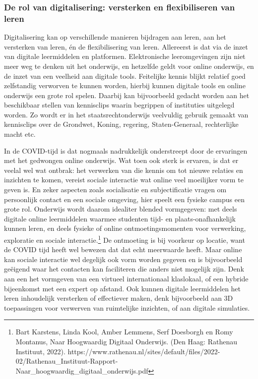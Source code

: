 \documentclass[empirical, authordate, ]{new-jote-article}
\begin{document}
	\subsubsection{De rol van digitalisering: versterken en flexibiliseren van leren}



	Digitalisering kan op verschillende manieren bijdragen aan leren, aan het versterken van leren, én de flexibilisering van leren. Allereerst is dat via de inzet van digitale leermiddelen en platformen. Elektronische leeromgevingen zijn niet meer weg te denken uit het onderwijs, en hetzelfde geldt voor online onderwijs, en de inzet van een veelheid aan digitale tools. Feitelijke kennis blijkt relatief goed zelfstandig verworven te kunnen worden, hierbij kunnen digitale tools en online onderwijs een grote rol spelen. Daarbij kan bijvoorbeeld gedacht worden aan het beschikbaar stellen van kennisclips waarin begrippen of instituties uitgelegd worden. Zo wordt er in het staatsrechtonderwijs veelvuldig gebruik gemaakt van kennisclips over de Grondwet, Koning, regering, Staten-Generaal, rechterlijke macht etc.



	In de COVID-tijd is dat nogmaals nadrukkelijk onderstreept door de ervaringen met het gedwongen online onderwijs. Wat toen ook sterk is ervaren, is dat er veelal wel wat ontbrak: het verwerken van die kennis om tot nieuwe relaties en inzichten te komen, vereist sociale interactie wat online veel moeilijker vorm te geven is. En zeker aspecten zoals socialisatie en subjectificatie vragen om persoonlijk contact en een sociale omgeving, hier speelt een fysieke campus een grote rol. Onderwijs wordt daarom idealiter blended vormgegeven: met deels digitale online leermiddelen waarmee studenten tijd- en plaats-onafhankelijk kunnen leren, en deels fysieke of online ontmoetingsmomenten voor verwerking, exploratie en sociale interactie.\footnote{Bart Karstens, Linda Kool, Amber Lemmens, Serf Doesborgh en Romy Montanus, Naar Hoogwaardig Digitaal Onderwijs. (Den Haag: Rathenau Instituut, 2022). https://www.rathenau.nl/sites/default/files/2022-02/Rathenau\_Instituut-Rapport-Naar\_hoogwaardig\_digitaal\_onderwijs.pdf } De ontmoeting is bij voorkeur op locatie, want de COVID tijd heeft wel bewezen dat dat echt meerwaarde heeft. Maar online kan sociale interactie wel degelijk ook vorm worden gegeven en is bijvoorbeeld geëigend waar het contacten kan faciliteren die anders niet mogelijk zijn. Denk aan een het vormgeven van een virtueel internationaal klaslokaal, of een hybride bijeenkomst met een expert op afstand. Ook kunnen digitale leermiddelen het leren inhoudelijk versterken of effectiever maken, denk bijvoorbeeld aan 3D toepassingen voor verwerven van ruimtelijke inzichten, of aan digitale simulaties.
\end{document}
